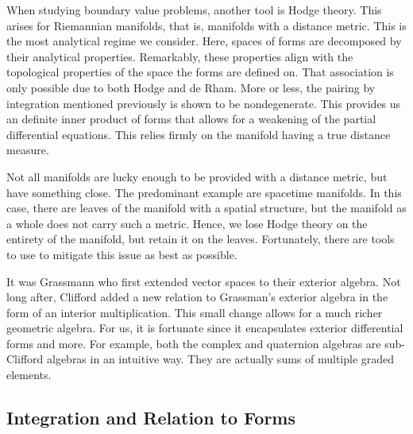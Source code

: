 \documentclass{article}
\begin{document}
When studying boundary value problems, another tool is Hodge theory. 
This arises for Riemannian manifolds, that is, manifolds with a distance metric. 
This is the most analytical regime we consider. 
Here, spaces of forms are decomposed by their analytical properties. 
Remarkably, these properties align with the topological properties of the space the forms are defined on. 
That association is only possible due to both Hodge and de Rham. 
More or less, the pairing by integration mentioned previously is shown to be nondegenerate. 
This provides us an definite inner product of forms that allows for a weakening of the partial differential equations. 
This relies firmly on the manifold having a true distance measure.

Not all manifolds are lucky enough to be provided with a distance metric, but have something close. 
The predominant example are spacetime manifolds. 
In this case, there are leaves of the manifold with a spatial structure, but the manifold as a whole does not carry such a metric. 
Hence, we lose Hodge theory on the entirety of the manifold, but retain it on the leaves. 
Fortunately, there are tools to use to mitigate this issue as best as possible.

It was Grassmann who first extended vector spaces to their exterior algebra. 
Not long after, Clifford added a new relation to Grassman's exterior algebra in the form of an interior multiplication. 
This small change allows for a much richer geometric algebra. 
For us, it is fortunate since it encapsulates exterior differential forms and more. 
For example, both the complex and quaternion algebras are sub-Clifford algebras in an intuitive way. 
They are actually sums of multiple graded elements.



\subsection{Integration and Relation to Forms}
\end{document}
